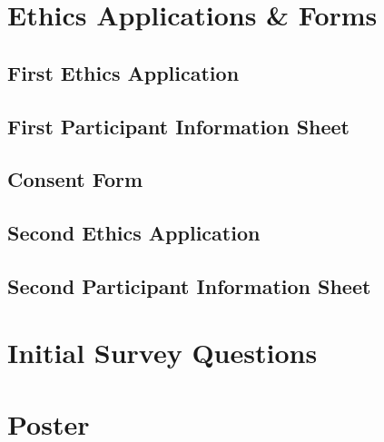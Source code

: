 
\chapter{Ethics Applications & Forms}

\section{First Ethics Application}
\label{appx:1-ea}



\section{First Participant Information Sheet}
\label{appx:1-pi}


\section{Consent Form}
\label{appx:consent}


\section{Second Ethics Application}
\label{appx:2-ea}


\section{Second Participant Information Sheet}
\label{appx:2-pi}



\chapter{Initial Survey Questions}
\label{appx:survey}


\chapter{Poster}
\label{appx:poster}

